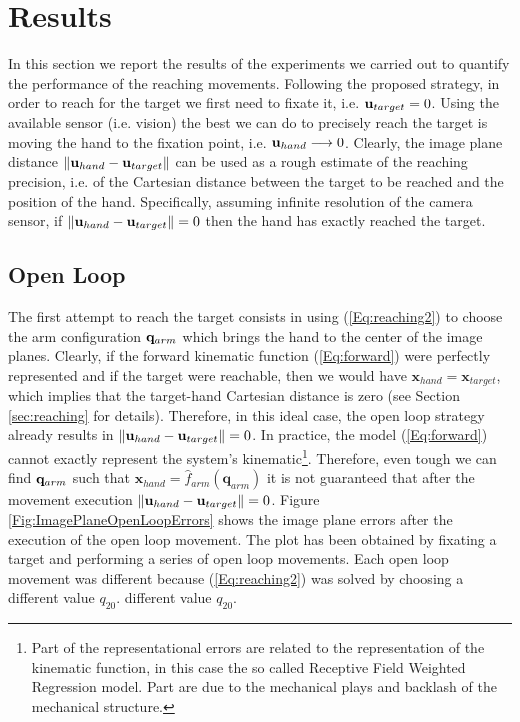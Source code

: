 \section{Results}
\label{sec:results}

In this section we report the results of the experiments we carried out
to quantify the performance of the reaching movements. Following the proposed strategy, 
in order to reach for the 
target we first need to fixate it, i.e. $\mathbf{u}_{target} = 0$. Using the available sensor (i.e. vision) the best we can do to precisely reach the target is moving the hand to the fixation point, i.e. $
{\mathbf{u}_{hand}} \longrightarrow 0$. Clearly, the image plane distance $\| \mathbf{u}_{hand} - \mathbf{u}_{target} \|$ can be used as a rough estimate of the reaching precision, i.e. of the Cartesian distance between the target to be reached and the position of the hand. Specifically, assuming infinite resolution of the camera sensor, if $\| \mathbf{u}_{hand} - \mathbf{u}_{target}\| = 0$ then the hand has exactly reached the target.

\subsection{Open Loop}
The first attempt to reach the target consists in using (\ref{Eq:reaching2})
to choose the arm configuration $\mathbf q_{arm}$ which brings the hand to the center 
of the image planes. Clearly, if the forward 
kinematic function (\ref{Eq:forward}) were perfectly represented and if the target were reachable, then we would have $\mathbf x_{hand} =  \mathbf x_{target}$, which implies that the target-hand Cartesian distance 
 is zero (see Section \ref{sec:reaching} for details). Therefore, in this ideal case, the open loop 
 strategy already results in $\| \mathbf{u}_{hand} - \mathbf{u}_{target} \| = 0$. In practice, the model 
 (\ref{Eq:forward}) cannot exactly represent the system's kinematic\footnote{Part of the representational 
 errors are related to the representation of the kinematic function, in this case the
 so called Receptive Field Weighted Regression model. Part are due to the mechanical plays and backlash of the
 mechanical structure.}. Therefore, even tough we can find $\mathbf q_{arm}$ such that $\mathbf x_{hand}=
 \hat f_{arm}(\mathbf q_{arm})$ it is not guaranteed that after the movement execution 
 $\| \mathbf{u}_{hand} - \mathbf{u}_{target} \| = 0$. Figure \ref{Fig:ImagePlaneOpenLoopErrors}
 shows the image plane errors after the execution of the open loop movement. The plot has been obtained
 by fixating a target and performing a series of open loop movements. Each open loop
 movement was different because (\ref{Eq:reaching2}) was solved 
 by choosing a different value $q_{20}$. different value $q_{20}$. 


